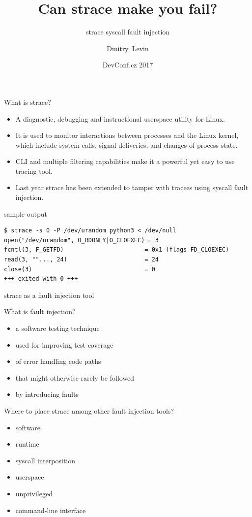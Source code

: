 \documentclass[unicode]{beamer}
\title{\Huge Can strace make you fail?}
\subtitle{\huge strace syscall fault injection}
\author{\Huge Dmitry~Levin}
\date{DevConf.cz 2017}
\begin{document}
\begin{frame}
\titlepage
\end{frame}

\begin{frame}[fragile]{What is strace?}
\begin{itemize}
	\item A diagnostic, debugging and instructional userspace
	utility for Linux.

	\item It is used to monitor interactions between processes and
	the Linux kernel, which include system calls, signal
	deliveries, and changes of process state.

	\item CLI and multiple filtering capabilities make it a powerful
	yet easy to use tracing tool.

	\item Last year strace has been extended to tamper with tracees
	using syscall fault injection.
\end{itemize}
\scriptsize
\begin{block}{\large sample output}
\begin{verbatim}
$ strace -s 0 -P /dev/urandom python3 < /dev/null
open("/dev/urandom", O_RDONLY|O_CLOEXEC) = 3
fcntl(3, F_GETFD)                       = 0x1 (flags FD_CLOEXEC)
read(3, ""..., 24)                      = 24
close(3)                                = 0
+++ exited with 0 +++
\end{verbatim}
\end{block}
\end{frame}

\begin{frame}{strace as a fault injection tool}
\begin{block}{\large What is fault injection?}
	\begin{itemize}
	\item a software testing technique
	\item used for improving test coverage
	\item of error handling code paths
	\item that might otherwise rarely be followed
	\item by introducing faults
	\end{itemize}
\end{block}
\begin{block}{\large Where to place strace among other fault injection tools?}
	\begin{itemize}
		\item software
		\item runtime
		\item syscall interposition
		\item userspace
		\item unprivileged
		\item command-line interface
	\end{itemize}
\end{block}
\end{frame}
\end{document}
